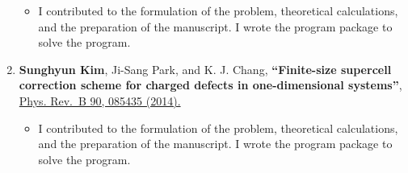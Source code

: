 \begin{enumerate}
  \begin{itemize}
  \tightlist
  \item
    I contributed to the formulation of the problem, theoretical
    calculations, and the preparation of the manuscript. I wrote the
    program package to solve the program.
  \end{itemize}
\item
  \textbf{Sunghyun Kim}, Ji-Sang Park, and K. J. Chang,
  \textbf{``Finite-size supercell correction scheme for charged defects
  in one-dimensional systems''},
  \href{http://journals.aps.org/prb/abstract/10.1103/PhysRevB.90.085435}{Phys.
  Rev.~B 90, 085435 (2014).}

  \begin{itemize}
  \tightlist
  \item
    I contributed to the formulation of the problem, theoretical
    calculations, and the preparation of the manuscript. I wrote the
    program package to solve the program.
  \end{itemize}
\end{enumerate}
